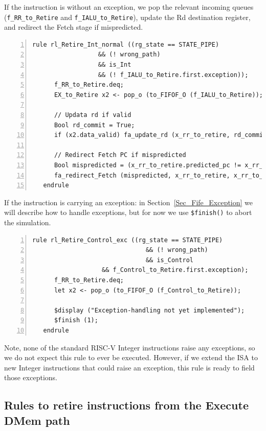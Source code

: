 If the instruction is without an exception, we pop the relevant
incoming queues (\verb|f_RR_to_Retire| and \verb|f_IALU_to_Retire|),
update the Rd destination register, and redirect the Fetch stage if
mispredicted.

{\small
\begin{Verbatim}[frame=single, numbers=left, label=(In file:src\_Fife/S5\_Retire.bsv)]
   rule rl_Retire_Int_normal ((rg_state == STATE_PIPE)
			      && (! wrong_path)
			      && is_Int
			      && (! f_IALU_to_Retire.first.exception));
      f_RR_to_Retire.deq;
      EX_to_Retire x2 <- pop_o (to_FIFOF_O (f_IALU_to_Retire));

      // Updata rd if valid
      Bool rd_commit = True;
      if (x2.data_valid) fa_update_rd (x_rr_to_retire, rd_commit, x2.data);

      // Redirect Fetch PC if mispredicted
      Bool mispredicted = (x_rr_to_retire.predicted_pc != x_rr_to_retire.fallthru_pc);
      fa_redirect_Fetch (mispredicted, x_rr_to_retire, x_rr_to_retire.fallthru_pc);
   endrule
\end{Verbatim}
}

If the instruction is carrying an exception: in
Section~\ref{Sec_Fife_Exception} we will describe how to handle
exceptions, but for now we use \verb|$finish()| to abort the
simulation.

{\small
\begin{Verbatim}[frame=single, numbers=left, label=(In file:src\_Fife/S5\_Retire.bsv)]
   rule rl_Retire_Control_exc ((rg_state == STATE_PIPE)
                               && (! wrong_path)
                               && is_Control
			       && f_Control_to_Retire.first.exception);
      f_RR_to_Retire.deq;
      let x2 <- pop_o (to_FIFOF_O (f_Control_to_Retire));

      $display ("Exception-handling not yet implemented");
      $finish (1);
   endrule
\end{Verbatim}
}

Note, none of the standard RISC-V Integer instructions raise any
exceptions, so we do not expect this rule to ever be
executed. However, if we extend the ISA to new Integer instructions
that could raise an exception, this rule is ready to field those
exceptions.


\subsection{Rules to retire instructions from the Execute DMem path}

